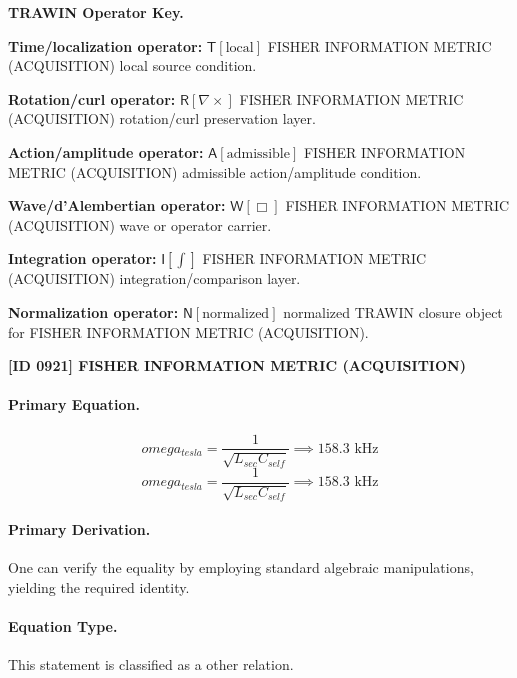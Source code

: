 \par\vspace{0.45\baselineskip}
\noindent\begin{minipage}[t]{\linewidth}
\begingroup
\small
\raggedright
\textbf{TRAWIN Operator Key.}\par
\noindent\textbf{Time/localization operator:} $\mathsf{T}\!\left[\mathrm{local}\right]$ FISHER INFORMATION METRIC (ACQUISITION) local source condition.\par
\noindent\textbf{Rotation/curl operator:} $\mathsf{R}\!\left[\nabla\times\right]$ FISHER INFORMATION METRIC (ACQUISITION) rotation/curl preservation layer.\par
\noindent\textbf{Action/amplitude operator:} $\mathsf{A}\!\left[\mathrm{admissible}\right]$ FISHER INFORMATION METRIC (ACQUISITION) admissible action/amplitude condition.\par
\noindent\textbf{Wave/d'Alembertian operator:} $\mathsf{W}\!\left[\Box\right]$ FISHER INFORMATION METRIC (ACQUISITION) wave or operator carrier.\par
\noindent\textbf{Integration operator:} $\mathsf{I}\!\left[\int\right]$ FISHER INFORMATION METRIC (ACQUISITION) integration/comparison layer.\par
\noindent\textbf{Normalization operator:} $\mathsf{N}\!\left[\mathrm{normalized}\right]$ normalized TRAWIN closure object for FISHER INFORMATION METRIC (ACQUISITION).\par
\endgroup
\end{minipage}

\clearpage
\noindent\textbf{[ID 0921] FISHER INFORMATION METRIC (ACQUISITION)}\par
\vspace{0.35em}
\paragraph{Primary Equation.}
\[
omega_{tesla} = \frac{1}{\sqrt{L_{sec} C_{self}}} \implies 158.3 \text{ kHz}
\]
\[
omega_{tesla} = \frac{1}{\sqrt{L_{sec} C_{self}}} \implies 158.3 \text{ kHz}
\]

\paragraph{Primary Derivation.}
One can verify the equality by employing standard algebraic manipulations, yielding the required identity.
\paragraph{Equation Type.}
This statement is classified as a other relation.

